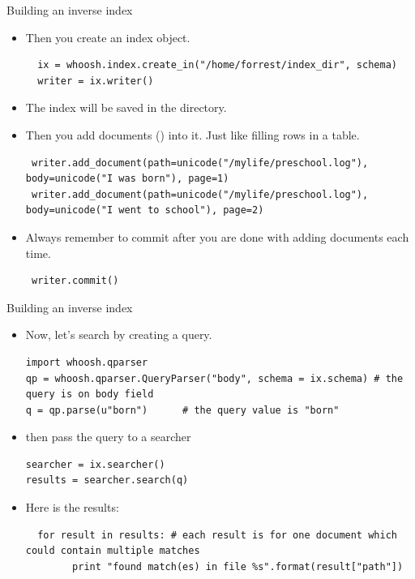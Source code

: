 \documentclass[11pt]{beamer}
\begin{document}
\begin{frame}[fragile]{Building an inverse index}
\begin{itemize}[<+->]
 \item Then you create an index object.  
 {\scriptsize
 \begin{lstlisting}
  ix = whoosh.index.create_in("/home/forrest/index_dir", schema) 
  writer = ix.writer()
 \end{lstlisting}
}
 \item The index will be saved in the directory. 
 \item Then you add documents ({\color{red}{not necessarily a real file but a piece of text}}) into it. Just like filling rows in a table. 
 
 {\scriptsize
 \begin{lstlisting}
 writer.add_document(path=unicode("/mylife/preschool.log"), body=unicode("I was born"), page=1)
 writer.add_document(path=unicode("/mylife/preschool.log"), body=unicode("I went to school"), page=2)
 \end{lstlisting}
}
 \item Always remember to commit after you are done with adding documents each time. 
 {\scriptsize
 \begin{lstlisting}
 writer.commit() 
 \end{lstlisting}
}
\end{itemize}
\end{frame}

\begin{frame}[fragile]{Building an inverse index}
\begin{itemize}[<+->]
 \item Now, let's search by creating a query. 
 {\scriptsize
 \begin{lstlisting}
import whoosh.qparser
qp = whoosh.qparser.QueryParser("body", schema = ix.schema) # the query is on body field
q = qp.parse(u"born")      # the query value is "born"
 \end{lstlisting}
}
 \item then pass the query to a searcher
 {\scriptsize
 \begin{lstlisting}
searcher = ix.searcher()
results = searcher.search(q)
 \end{lstlisting}
}
 \item Here is the results:
 {\scriptsize
 \begin{lstlisting}
  for result in results: # each result is for one document which could contain multiple matches 
        print "found match(es) in file %s".format(result["path"])
 \end{lstlisting}
}

\end{itemize}
\end{frame}
\end{document}
